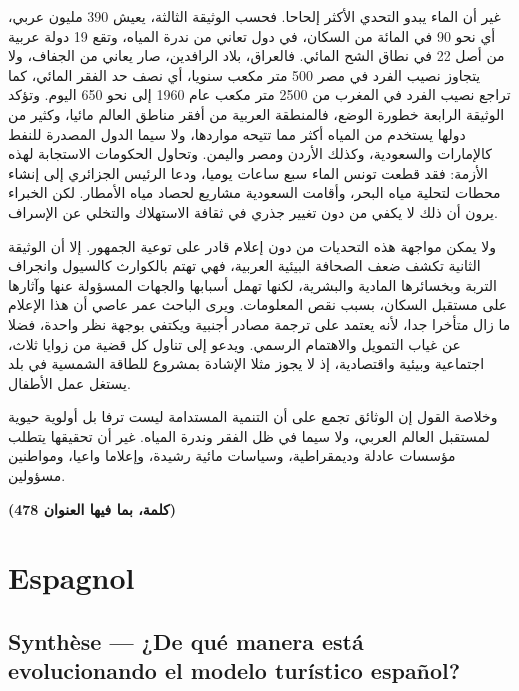 \documentclass[11pt,a4paper]{article}
\begin{document}
غير أن الماء يبدو التحدي الأكثر إلحاحا. فحسب الوثيقة الثالثة، يعيش 390 مليون عربي، أي نحو 90 في المائة من السكان، في دول تعاني من ندرة المياه، وتقع 19 دولة عربية من أصل 22 في نطاق الشح المائي. فالعراق، بلاد الرافدين، صار يعاني من الجفاف، ولا يتجاوز نصيب الفرد في مصر 500 متر مكعب سنويا، أي نصف حد الفقر المائي، كما تراجع نصيب الفرد في المغرب من 2500 متر مكعب عام 1960 إلى نحو 650 اليوم. وتؤكد الوثيقة الرابعة خطورة الوضع، فالمنطقة العربية من أفقر مناطق العالم مائيا، وكثير من دولها يستخدم من المياه أكثر مما تتيحه مواردها، ولا سيما الدول المصدرة للنفط كالإمارات والسعودية، وكذلك الأردن ومصر واليمن. وتحاول الحكومات الاستجابة لهذه الأزمة: فقد قطعت تونس الماء سبع ساعات يوميا، ودعا الرئيس الجزائري إلى إنشاء محطات لتحلية مياه البحر، وأقامت السعودية مشاريع لحصاد مياه الأمطار. لكن الخبراء يرون أن ذلك لا يكفي من دون تغيير جذري في ثقافة الاستهلاك والتخلي عن الإسراف.

ولا يمكن مواجهة هذه التحديات من دون إعلام قادر على توعية الجمهور. إلا أن الوثيقة الثانية تكشف ضعف الصحافة البيئية العربية، فهي تهتم بالكوارث كالسيول وانجراف التربة وبخسائرها المادية والبشرية، لكنها تهمل أسبابها والجهات المسؤولة عنها وآثارها على مستقبل السكان، بسبب نقص المعلومات. ويرى الباحث عمر عاصي أن هذا الإعلام ما زال متأخرا جدا، لأنه يعتمد على ترجمة مصادر أجنبية ويكتفي بوجهة نظر واحدة، فضلا عن غياب التمويل والاهتمام الرسمي. ويدعو إلى تناول كل قضية من زوايا ثلاث، اجتماعية وبيئية واقتصادية، إذ لا يجوز مثلا الإشادة بمشروع للطاقة الشمسية في بلد يستغل عمل الأطفال.

وخلاصة القول إن الوثائق تجمع على أن التنمية المستدامة ليست ترفا بل أولوية حيوية لمستقبل العالم العربي، ولا سيما في ظل الفقر وندرة المياه. غير أن تحقيقها يتطلب مؤسسات عادلة وديمقراطية، وسياسات مائية رشيدة، وإعلاما واعيا، ومواطنين مسؤولين.

\textbf{(478 كلمة، بما فيها العنوان)}

\hypertarget{espagnol}{%
\section{Espagnol}\label{espagnol}}

\hypertarget{synthuxe8se-de-quuxe9-manera-estuxe1-evolucionando-el-modelo-turuxedstico-espauxf1ol}{%
\subsection{Synthèse --- ¿De qué manera está evolucionando el modelo turístico español?}\label{synthuxe8se-de-quuxe9-manera-estuxe1-evolucionando-el-modelo-turuxedstico-espauxf1ol}}
\end{document}
